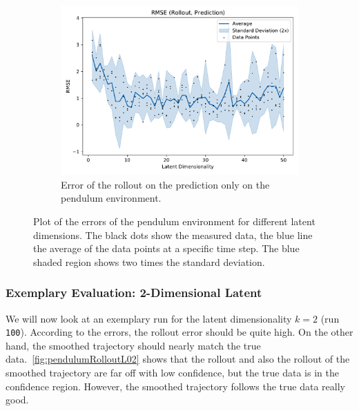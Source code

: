 \begin{figure}
\begin{subfigure}{0.5\linewidth}
				\end{subfigure}%
				~
				\begin{subfigure}{0.5\linewidth}
					\centering
					\includegraphics[width=\linewidth]{figures/results/pendulum/latent-dim/comparison-rmse-rollout-prediction-mean-vs-latent-dim.pdf}
					\caption{Error of the rollout on the prediction only on the pendulum environment.}
					\label{fig:pendulumRmsePred}
				\end{subfigure}
				\caption{Plot of the errors of the pendulum environment for different latent dimensions. The black dots show the measured data, the blue line the average of the data points at a specific time step. The blue shaded region shows two times the standard deviation.}
				\label{fig:pendulumRmse}
			\end{figure}

		\subsubsection{Exemplary Evaluation: 2-Dimensional Latent}
			We will now look at an exemplary run for the latent dimensionality \( k = 2 \) (run \texttt{100}). According to the errors, the rollout error should be quite high. On the other hand, the smoothed trajectory should nearly match the true data.~\autoref{fig:pendulumRolloutL02} shows that the rollout and also the rollout of the smoothed trajectory are far off with low confidence, but the true data is in the confidence region. However, the smoothed trajectory follows the true data really good.

